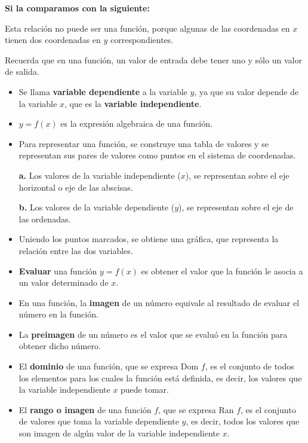 \documentclass[12pt,a4paper]{article}
\begin{document}
\begin{tcolorbox}[colback=fondorosa,colframe=rojoclaro,breakable]

\textbf{Si la comparamos con la siguiente:}

\begin{center}
\shorthandoff{<>}
\shorthandon{<>}
\end{center}

Esta relación no puede ser una función, porque algunas de las coordenadas en $x$ tienen dos coordenadas en $y$ correspondientes.

Recuerda que en una función, un valor de entrada debe tener uno y sólo un valor de salida.

\begin{itemize}
\item Se llama \textbf{variable dependiente} a la variable $y$, ya que su valor depende de la variable $x$, que es la \textbf{variable independiente}.
\item $y = f(x)$ es la expresión algebraica de una función.
\item Para representar una función, se construye una tabla de valores y se representan sus pares de valores como puntos en el sistema de coordenadas.

\textbf{a.} Los valores de la variable independiente ($x$), se representan sobre el eje horizontal o eje de las abscisas.

\textbf{b.} Los valores de la variable dependiente ($y$), se representan sobre el eje de las ordenadas.

\item Uniendo los puntos marcados, se obtiene una gráfica, que representa la relación entre las dos variables.
\item \textbf{Evaluar} una función $y = f(x)$ es obtener el valor que la función le asocia a un valor determinado de $x$.
\item En una función, la \textbf{imagen} de un número equivale al resultado de evaluar el número en la función.
\item La \textbf{preimagen} de un número es el valor que se evaluó en la función para obtener dicho número.
\item El \textbf{dominio} de una función, que se expresa Dom $f$, es el conjunto de todos los elementos para los cuales la función está definida, es decir, los valores que la variable independiente $x$ puede tomar.
\item El \textbf{rango o imagen} de una función $f$, que se expresa Ran $f$, es el conjunto de valores que toma la variable dependiente $y$, es decir, todos los valores que son imagen de algún valor de la variable independiente $x$.
\end{itemize}


\end{tcolorbox}
\end{document}
